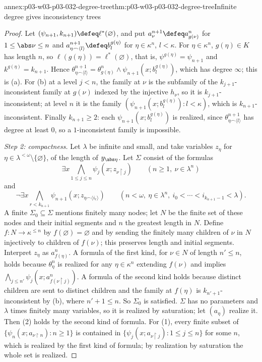 \begin{annexitem}{annex:p03-w03-p03-032-degree-tree}{thm:p03-w03-p03-032-degree-tree}{Infinite degree gives inconsistency trees}
\begin{proof}
Let \((\psi_{n+1},k_{n+1})\defeq\ell^*(\varnothing)\), and put
\(a^{n+1}_\nu\defeq a^n_{g(\nu)}\) for \(1\leq\abs\nu\leq n\) and
\(a^{n+1}_{\eta\frown\langle l\rangle}\defeq b^{g(\eta)}_l\) for
\(\eta\in\kappa^n\), \(l<\kappa\).  For \(\eta\in\kappa^n\), \(g(\eta)\in K\)
has length \(n\), so \(\ell(g(\eta))=\ell^*(\varnothing)\), that is,
\(\psi^{g(\eta)}=\psi_{n+1}\) and \(k^{g(\eta)}=k_{n+1}\).  Hence
\(\theta^{n+1}_{\eta\frown\langle l\rangle}=\theta^n_{g(\eta)}\wedge
\psi_{n+1}(x;b^{g(\eta)}_l)\), which has degree \(\infty\); this is (a).  For
(b) at a level \(j<n\), the family at \(\nu\) is the subfamily of the
\(k_{j+1}\)-inconsistent family at \(g(\nu)\) indexed by the injective
\(h_\nu\), so it is \(k_{j+1}\)-inconsistent; at level \(n\) it is the family
\((\psi_{n+1}(x;b^{g(\eta)}_l):l<\kappa)\), which is
\(k_{n+1}\)-inconsistent.  Finally \(k_{n+1}\geq2\): each
\(\psi_{n+1}(x;b^{g(\eta)}_l)\) is realized, since
\(\theta^{n+1}_{\eta\frown\langle l\rangle}\) has degree at least \(0\), so a
\(1\)-inconsistent family is impossible.

\emph{Step 2: compactness.}  Let \(\lambda\) be infinite and small, and take
variables \(z_\eta\) for \(\eta\in\lambda^{<\omega}\setminus\{\varnothing\}\),
of the length of \(y_{\abs\eta}\).  Let \(\Sigma\) consist of the formulas
\[
  \exists x\bigwedge_{1\leq j\leq n}\psi_j(x;z_{\nu\mathbin{\upharpoonright}j})
  \qquad(n\geq1,\ \nu\in\lambda^n)
\]
and
\[
  \neg\exists x\bigwedge_{r<k_{n+1}}
  \psi_{n+1}(x;z_{\eta\frown\langle i_r\rangle})
  \qquad(n<\omega,\ \eta\in\lambda^n,\
  i_0<\cdots<i_{k_{n+1}-1}<\lambda).
\]
A finite \(\Sigma_0\subseteq\Sigma\) mentions finitely many nodes; let \(N\)
be the finite set of these nodes and their initial segments and \(n\) the
greatest length in \(N\).  Define \(f:N\to\kappa^{\leq n}\) by
\(f(\varnothing)=\varnothing\) and by sending the finitely many children of
\(\nu\) in \(N\) injectively to children of \(f(\nu)\); this preserves
length and initial segments.  Interpret \(z_\eta\) as \(a^n_{f(\eta)}\).  A
formula of the first kind, for \(\nu\in N\) of length \(n'\leq n\), holds
because \(\theta^n_{\eta}\) is realized for any \(\eta\in\kappa^n\)
extending \(f(\nu)\) and implies
\(\bigwedge_{j\leq n'}\psi_j(x;a^n_{f(\nu\mathbin{\upharpoonright}j)})\).  A
formula of the second kind holds because distinct children are sent to
distinct children and the family at \(f(\eta)\) is
\(k_{n'+1}\)-inconsistent by (b), where \(n'+1\leq n\).  So \(\Sigma_0\) is
satisfied.  \(\Sigma\) has no parameters and \(\lambda\) times finitely many
variables, so it is realized by saturation; let \((a_\eta)\) realize it.
Then (2) holds by the second kind of formula.  For (1), every finite subset
of \(\{\psi_n(x;a_{\nu\mathbin{\upharpoonright}n}):n\geq1\}\) is contained in
\(\{\psi_j(x;a_{\nu\mathbin{\upharpoonright}j}):1\leq j\leq n\}\) for some
\(n\), which is realized by the first kind of formula; by realization by
saturation the whole set is realized.
\end{proof}
\end{annexitem}

